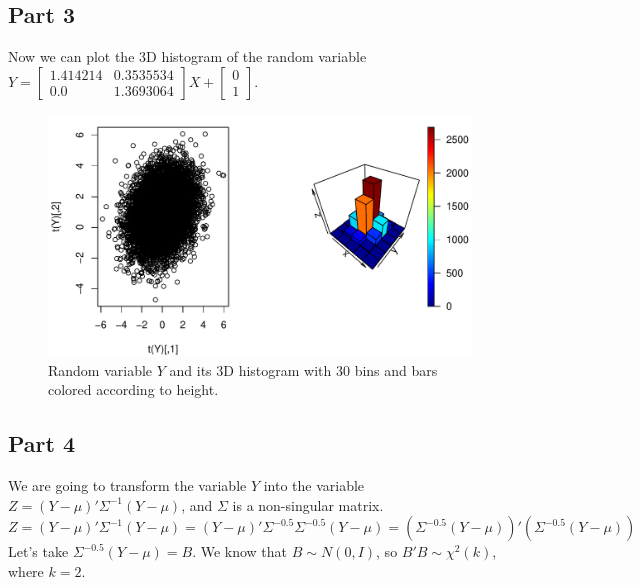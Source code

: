 \documentclass[12pt, a4paper]{article}\usepackage[]{graphicx}\usepackage[]{color}
\makeatletter
\def\maxwidth{ %
  \ifdim\Gin@nat@width>\linewidth
    \linewidth
  \else
    \Gin@nat@width
  \fi
}
\newenvironment{knitrout}{}{} %
\makeatother
\begin{document}
\subsection{Part 3}
Now we can plot the 3D histogram of the random variable $Y = \left[\begin{matrix} 1.414214 & 0.3535534 \\ 0.0 & 1.3693064 \end{matrix} \right]X+\left[\begin{matrix}0\\1\end{matrix}\right]$.
\begin{knitrout}
\color{fgcolor}\begin{figure}[H]

{\centering \includegraphics[width=\maxwidth]{figure/ex2_3hist3d-1} 

}

\caption[Random variable $Y$ and its 3D histogram with 30 bins and bars colored according to height]{Random variable $Y$ and its 3D histogram with 30 bins and bars colored according to height.}\label{fig:ex2.3hist3d}
\end{figure}


\end{knitrout}


\subsection{Part 4}
We are going to transform the variable $Y$ into the variable $Z= (Y-\mu)' \Sigma^{-1} (Y-\mu)$, and $\Sigma$ is a non-singular matrix.
\[
Z = (Y-\mu)' \Sigma^{-1} (Y-\mu) = (Y-\mu)' \Sigma^{-0.5} \Sigma^{-0.5} (Y-\mu) = \left(\Sigma^{-0.5} (Y-\mu)\right)' \left(\Sigma^{-0.5} (Y-\mu)\right)
\]
Let's take $\Sigma^{-0.5} (Y-\mu) = B$. We know that $B \sim N(0,I)$, so $B'B \sim \chi^2(k)$, where $k=2$.
\end{document}
